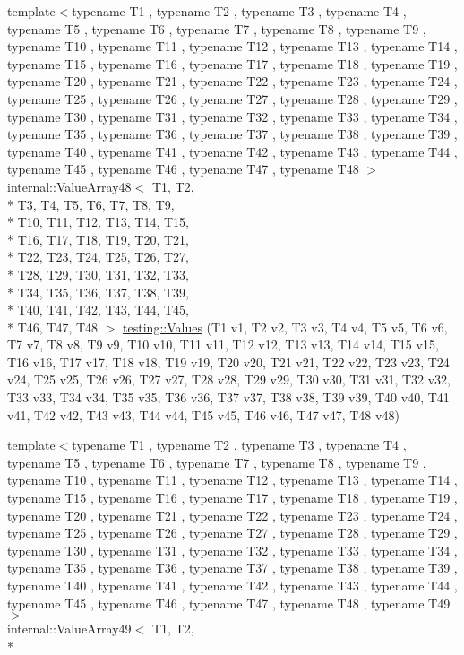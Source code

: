 \begin{DoxyCompactItemize}
\item 
{\footnotesize template$<$typename T1 , typename T2 , typename T3 , typename T4 , typename T5 , typename T6 , typename T7 , typename T8 , typename T9 , typename T10 , typename T11 , typename T12 , typename T13 , typename T14 , typename T15 , typename T16 , typename T17 , typename T18 , typename T19 , typename T20 , typename T21 , typename T22 , typename T23 , typename T24 , typename T25 , typename T26 , typename T27 , typename T28 , typename T29 , typename T30 , typename T31 , typename T32 , typename T33 , typename T34 , typename T35 , typename T36 , typename T37 , typename T38 , typename T39 , typename T40 , typename T41 , typename T42 , typename T43 , typename T44 , typename T45 , typename T46 , typename T47 , typename T48 $>$ }\\internal\-::\-Value\-Array48$<$ T1, T2, \\*
T3, T4, T5, T6, T7, T8, T9, \\*
T10, T11, T12, T13, T14, T15, \\*
T16, T17, T18, T19, T20, T21, \\*
T22, T23, T24, T25, T26, T27, \\*
T28, T29, T30, T31, T32, T33, \\*
T34, T35, T36, T37, T38, T39, \\*
T40, T41, T42, T43, T44, T45, \\*
T46, T47, T48 $>$ \hyperlink{namespacetesting_af3cdf373b137d357bb3a814c097bcd06}{testing\-::\-Values} (T1 v1, T2 v2, T3 v3, T4 v4, T5 v5, T6 v6, T7 v7, T8 v8, T9 v9, T10 v10, T11 v11, T12 v12, T13 v13, T14 v14, T15 v15, T16 v16, T17 v17, T18 v18, T19 v19, T20 v20, T21 v21, T22 v22, T23 v23, T24 v24, T25 v25, T26 v26, T27 v27, T28 v28, T29 v29, T30 v30, T31 v31, T32 v32, T33 v33, T34 v34, T35 v35, T36 v36, T37 v37, T38 v38, T39 v39, T40 v40, T41 v41, T42 v42, T43 v43, T44 v44, T45 v45, T46 v46, T47 v47, T48 v48)
\item 
{\footnotesize template$<$typename T1 , typename T2 , typename T3 , typename T4 , typename T5 , typename T6 , typename T7 , typename T8 , typename T9 , typename T10 , typename T11 , typename T12 , typename T13 , typename T14 , typename T15 , typename T16 , typename T17 , typename T18 , typename T19 , typename T20 , typename T21 , typename T22 , typename T23 , typename T24 , typename T25 , typename T26 , typename T27 , typename T28 , typename T29 , typename T30 , typename T31 , typename T32 , typename T33 , typename T34 , typename T35 , typename T36 , typename T37 , typename T38 , typename T39 , typename T40 , typename T41 , typename T42 , typename T43 , typename T44 , typename T45 , typename T46 , typename T47 , typename T48 , typename T49 $>$ }\\internal\-::\-Value\-Array49$<$ T1, T2, \\*

\end{DoxyCompactItemize}
